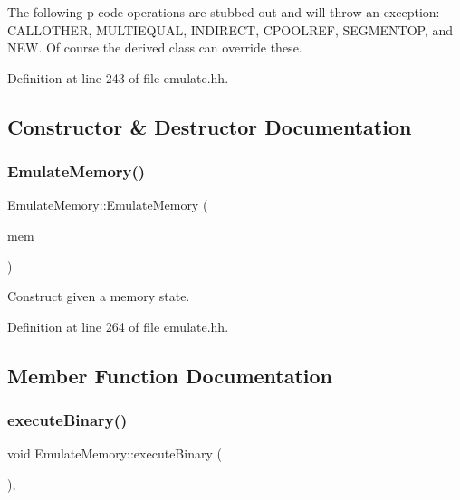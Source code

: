 The following p-\/code operations are stubbed out and will throw an exception\+: C\+A\+L\+L\+O\+T\+H\+ER, M\+U\+L\+T\+I\+E\+Q\+U\+AL, I\+N\+D\+I\+R\+E\+CT, C\+P\+O\+O\+L\+R\+EF, S\+E\+G\+M\+E\+N\+T\+OP, and N\+EW. Of course the derived class can override these. 

Definition at line 243 of file emulate.\+hh.



\subsection{Constructor \& Destructor Documentation}
\mbox{\label{class_emulate_memory_a9d930600f03d692217331ff1f39f4650}} 
\subsubsection{\texorpdfstring{EmulateMemory()}{EmulateMemory()}}
{\footnotesize\ttfamily Emulate\+Memory\+::\+Emulate\+Memory (\begin{DoxyParamCaption}\item[{\mbox{\hyperlink{class_memory_state}{Memory\+State}} $\ast$}]{mem }\end{DoxyParamCaption})\hspace{0.3cm}{\ttfamily [inline]}}



Construct given a memory state. 



Definition at line 264 of file emulate.\+hh.



\subsection{Member Function Documentation}
\mbox{\label{class_emulate_memory_a1570bf6221f1d26978873823f94ce469}} 
\subsubsection{\texorpdfstring{executeBinary()}{executeBinary()}}
{\footnotesize\ttfamily void Emulate\+Memory\+::execute\+Binary (\begin{DoxyParamCaption}\item[{void}]{ }\end{DoxyParamCaption})\hspace{0.3cm}{\ttfamily [protected]}, {\ttfamily [virtual]}}




